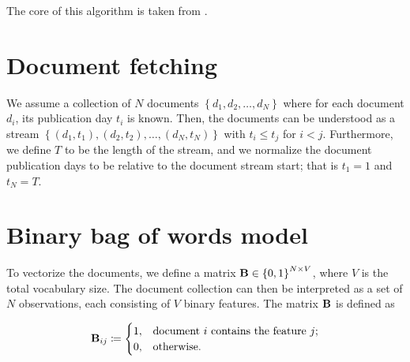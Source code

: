 

\newcommand{\doccount}{N}
\newcommand{\featcount}{V}
\newcommand{\streamlen}{T}
\newcommand{\traj}{y}
\newcommand{\df}{DF}
\newcommand{\featset}{\text{M}}
\newcommand{\cost}{\text{C}}

\newcommand{\docoverlap}{\text{d}}
\newcommand{\featsim}{\text{JSD}}

\newcommand{\bowmat}{\mat{B}}
\newcommand{\dtdmat}{\mat{D}}
\newcommand{\trajmat}{\mat{T}}


The core of this algorithm is taken from \cite{event-detection}.

\section{Document fetching}
We assume a collection of $N$ documents $\left\{ d_{1}, d_{2}, \dots, d_{\doccount} \right\}$ where for each document $d_{i}$, its publication day $t_{i}$ is known. Then, the documents can be understood as a stream $\left\{ (d_{1}, t_{1}), (d_{2}, t_{2}), \dots, (d_{\doccount}, t_{\doccount}) \right\}$ with $t_{i} \leq t_{j}$ for $i < j$. Furthermore, we define $\streamlen$ to be the length of the stream, and we normalize the document publication days to be relative to the document stream start; that is $t_{1} = 1$ and $t_{\doccount} = \streamlen$.


\section{Binary bag of words model}
To vectorize the documents, we define a matrix $\bowmat \in \left\{ 0, 1 \right\}^{\doccount \times \featcount}$, where $\featcount$ is the total vocabulary size. The document collection can then be interpreted as a set of $\doccount$ observations, each consisting of $\featcount$ binary features. The matrix $\bowmat$ is defined as

\begin{equation} \label{eq:bow-matrix}
	\bowmat_{ij} \coloneqq
	\begin{cases}
		1, & \text{document}~i~\text{contains the feature}~j \text{;} \\
		0, & \text{otherwise.}
	\end{cases}
\end{equation}

